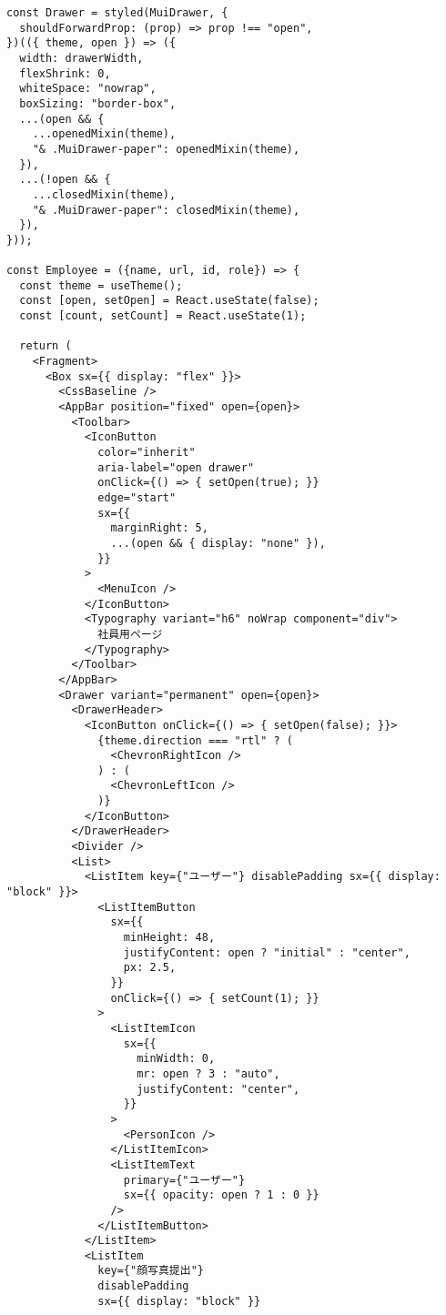 \begin{verbatim}
const Drawer = styled(MuiDrawer, {
  shouldForwardProp: (prop) => prop !== "open",
})(({ theme, open }) => ({
  width: drawerWidth,
  flexShrink: 0,
  whiteSpace: "nowrap",
  boxSizing: "border-box",
  ...(open && {
    ...openedMixin(theme),
    "& .MuiDrawer-paper": openedMixin(theme),
  }),
  ...(!open && {
    ...closedMixin(theme),
    "& .MuiDrawer-paper": closedMixin(theme),
  }),
}));

const Employee = ({name, url, id, role}) => {
  const theme = useTheme();
  const [open, setOpen] = React.useState(false);
  const [count, setCount] = React.useState(1);

  return (
    <Fragment>
      <Box sx={{ display: "flex" }}>
        <CssBaseline />
        <AppBar position="fixed" open={open}>
          <Toolbar>
            <IconButton
              color="inherit"
              aria-label="open drawer"
              onClick={() => { setOpen(true); }}
              edge="start"
              sx={{
                marginRight: 5,
                ...(open && { display: "none" }),
              }}
            >
              <MenuIcon />
            </IconButton>
            <Typography variant="h6" noWrap component="div">
              社員用ページ
            </Typography>
          </Toolbar>
        </AppBar>
        <Drawer variant="permanent" open={open}>
          <DrawerHeader>
            <IconButton onClick={() => { setOpen(false); }}>
              {theme.direction === "rtl" ? (
                <ChevronRightIcon />
              ) : (
                <ChevronLeftIcon />
              )}
            </IconButton>
          </DrawerHeader>
          <Divider />
          <List>
            <ListItem key={"ユーザー"} disablePadding sx={{ display: "block" }}>
              <ListItemButton
                sx={{
                  minHeight: 48,
                  justifyContent: open ? "initial" : "center",
                  px: 2.5,
                }}
                onClick={() => { setCount(1); }}
              >
                <ListItemIcon
                  sx={{
                    minWidth: 0,
                    mr: open ? 3 : "auto",
                    justifyContent: "center",
                  }}
                >
                  <PersonIcon />
                </ListItemIcon>
                <ListItemText
                  primary={"ユーザー"}
                  sx={{ opacity: open ? 1 : 0 }}
                />
              </ListItemButton>
            </ListItem>
            <ListItem
              key={"顔写真提出"}
              disablePadding
              sx={{ display: "block" }}

\end{verbatim}
